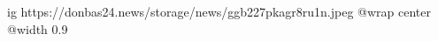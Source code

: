  
 
 
 
 

\ifcmt
  ig https://donbas24.news/storage/news/ggb227pkagr8ru1n.jpeg
  @wrap center
  @width 0.9
\fi
